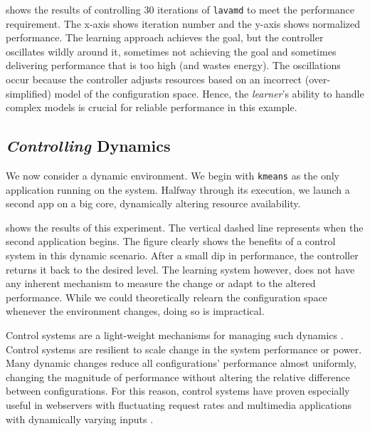  shows the results of controlling 30
iterations of \texttt{lavamd} to meet the performance requirement.
The x-axis shows iteration number and the y-axis shows normalized
performance.  The learning approach achieves the goal, but the
controller oscillates wildly around it, sometimes not achieving the
goal and sometimes delivering performance that is too high (and wastes
energy). The oscillations occur because the controller adjusts
resources based on an incorrect (over-simplified) model of the
configuration space. Hence, the \emph{learner}'s ability to handle
complex models is crucial for reliable performance in this example.


\subsection{\emph{Controlling} Dynamics}
We now consider a dynamic environment.  We begin with \texttt{kmeans}
as the only application running on the system.  Halfway through its
execution, we launch a second app on a big core, dynamically altering
resource availability.

 shows the results of this experiment.
The vertical dashed line represents when the second application
begins.  The figure clearly shows the benefits of a control system in
this dynamic scenario.  After a small dip in performance, the
controller returns it back to the desired level.  The learning system
however, does not have any inherent mechanism to measure the change or
adapt to the altered performance.  While we could theoretically
relearn the configuration space whenever the environment changes,
doing so is impractical.

Control systems are a light-weight mechanisms for managing such
dynamics \cite{Hellerstein2004a}. Control systems are resilient to
scale change in the system performance or power.  Many dynamic changes
reduce all configurations' performance almost uniformly, changing the
magnitude of performance without altering the relative difference
between configurations.  For this reason, control systems have proven
especially useful in webservers with fluctuating request rates
\cite{Horvarth,LuEtAl-2006a,SunDaiPan-2008a} and multimedia
applications with dynamically varying inputs
\cite{TCST,Agilos,grace2}.


